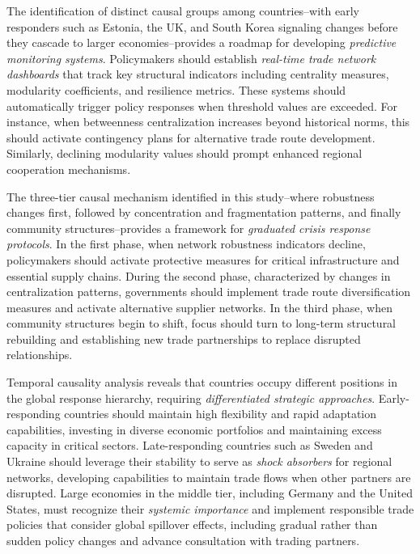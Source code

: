 \documentclass[preprint, 3p,
authoryear]{elsarticle} %
\begin{document}
The identification of distinct causal groups among countries--with early
responders such as Estonia, the UK, and South Korea signaling changes
before they cascade to larger economies--provides a roadmap for
developing \emph{predictive monitoring systems}. Policymakers should
establish \emph{real-time trade network dashboards} that track key
structural indicators including centrality measures, modularity
coefficients, and resilience metrics. These systems should automatically
trigger policy responses when threshold values are exceeded. For
instance, when betweenness centralization increases beyond historical
norms, this should activate contingency plans for alternative trade
route development. Similarly, declining modularity values should prompt
enhanced regional cooperation mechanisms.

The three-tier causal mechanism identified in this study--where
robustness changes first, followed by concentration and fragmentation
patterns, and finally community structures--provides a framework for
\emph{graduated crisis response protocols}. In the first phase, when
network robustness indicators decline, policymakers should activate
protective measures for critical infrastructure and essential supply
chains. During the second phase, characterized by changes in
centralization patterns, governments should implement trade route
diversification measures and activate alternative supplier networks. In
the third phase, when community structures begin to shift, focus should
turn to long-term structural rebuilding and establishing new trade
partnerships to replace disrupted relationships.

Temporal causality analysis reveals that countries occupy different
positions in the global response hierarchy, requiring
\emph{differentiated strategic approaches}. Early-responding countries
should maintain high flexibility and rapid adaptation capabilities,
investing in diverse economic portfolios and maintaining excess capacity
in critical sectors. Late-responding countries such as Sweden and
Ukraine should leverage their stability to serve as \emph{shock
absorbers} for regional networks, developing capabilities to maintain
trade flows when other partners are disrupted. Large economies in the
middle tier, including Germany and the United States, must recognize
their \emph{systemic importance} and implement responsible trade
policies that consider global spillover effects, including gradual
rather than sudden policy changes and advance consultation with trading
partners.
\end{document}
